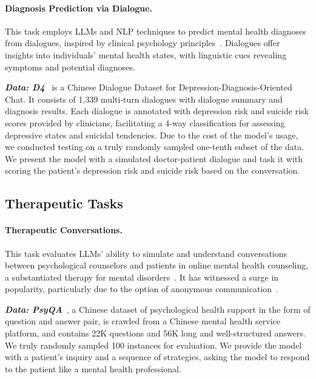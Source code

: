 \paragraph*{Diagnosis Prediction via Dialogue.} This task employs LLMs and NLP techniques to predict mental health diagnoses from dialogues, inspired by clinical psychology principles~\cite{pacheco-lorenzo2021smart}. Dialogues offer insights into individuals' mental health states, with linguistic cues revealing symptoms and potential diagnoses.

\textbf{\textit{Data: D4}}~\cite{yao-etal-2022-d4} is a Chinese Dialogue Dataset for Depression-Diagnosis-Oriented Chat. It consists of 1,339 multi-turn dialogues with dialogue summary and diagnosis results. Each dialogue is annotated with depression risk and suicide risk scores provided by clinicians, facilitating a 4-way classification for assessing depressive states and suicidal tendencies.
Due to the cost of the model's usage, we conducted testing on a truly randomly sampled one-tenth subset of the data. We present the model with a simulated doctor-patient dialogue and task it with scoring the patient's depression risk and suicide risk based on the conversation.

\subsection{Therapeutic Tasks}
    
\paragraph*{Therapeutic Conversations.} This task evaluates LLMs' ability to simulate and understand conversations between psychological counselors and patients in online mental health counseling, a substantiated therapy for mental disorders~\cite{reynolds2013impact}. It has witnessed a surge in popularity, particularly due to the option of anonymous communication~\cite{fu2020effectiveness}.

\textbf{\textit{Data: PsyQA}}~\cite{sun-etal-2021-psyqa}, a Chinese dataset of psychological health support in the form of question and answer pair, is crawled from a Chinese mental health service platform, and contains 22K questions and 56K long and well-structured answers. We truly randomly sampled 100 instances for evaluation. We provide the model with a patient's inquiry and a sequence of strategies, asking the model to respond to the patient like a mental health professional.

